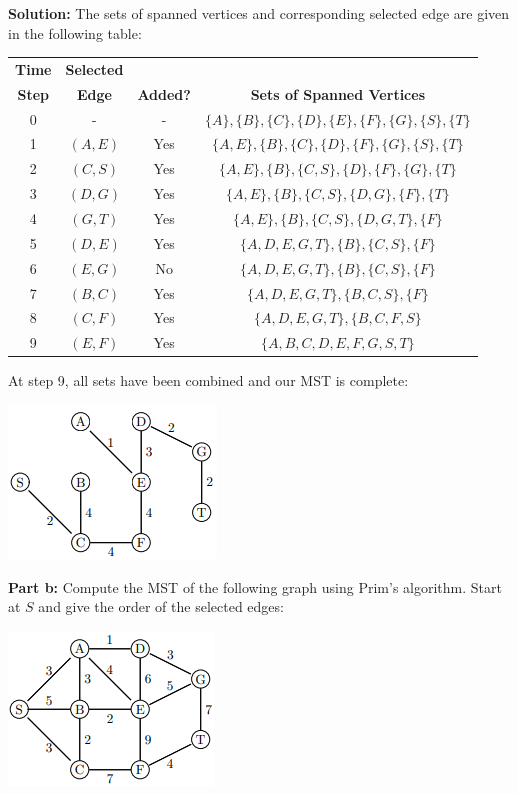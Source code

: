 \documentclass{article}
\begin{document}
\noindent\textbf{Solution:} The sets of spanned vertices and corresponding selected edge are given in the following table:
\begin{center}
\begin{tabular}{c|c|c|c}
  \textbf{Time} & \textbf{Selected} & &\\
  \textbf{Step} & \textbf{Edge} & \textbf{Added?} & \textbf{Sets of Spanned Vertices}\\
  \hline
  0 & - & - & $\{A\},\{B\},\{C\},\{D\},\{E\},\{F\},\{G\},\{S\},\{T\}$\\
  \hline
  1 & $(A,E)$ & Yes & $\{A,E\},\{B\},\{C\},\{D\},\{F\},\{G\},\{S\},\{T\}$\\
  \hline
  2 & $(C,S)$ & Yes & $\{A,E\},\{B\},\{C,S\},\{D\},\{F\},\{G\},\{T\}$\\
  \hline
  3 & $(D,G)$ & Yes & $\{A,E\},\{B\},\{C,S\},\{D,G\},\{F\},\{T\}$\\
  \hline
  4 & $(G,T)$ & Yes & $\{A,E\},\{B\},\{C,S\},\{D,G,T\},\{F\}$\\
  \hline
  5 & $(D,E)$ & Yes & $\{A,D,E,G,T\},\{B\},\{C,S\},\{F\}$\\
  \hline
  6 & $(E,G)$ & No & $\{A,D,E,G,T\},\{B\},\{C,S\},\{F\}$\\
  \hline
  7 & $(B,C)$ & Yes & $\{A,D,E,G,T\},\{B,C,S\},\{F\}$\\
  \hline
  8 & $(C,F)$ & Yes & $\{A,D,E,G,T\},\{B,C,F,S\}$\\
  \hline
  9 & $(E,F)$ & Yes & $\{A,B,C,D,E,F,G,S,T\}$
\end{tabular}
\end{center}
\smallskip

At step 9, all sets have been combined and our MST is complete:
\begin{center}
  \includegraphics{graph4aMST.png}
\end{center}
\bigskip

\noindent\textbf{Part b:} Compute the MST of the following graph using Prim’s algorithm. Start at $S$ and give the order of the selected edges:
\begin{center}
  \includegraphics{graph4b.png}
\end{center}
\end{document}
